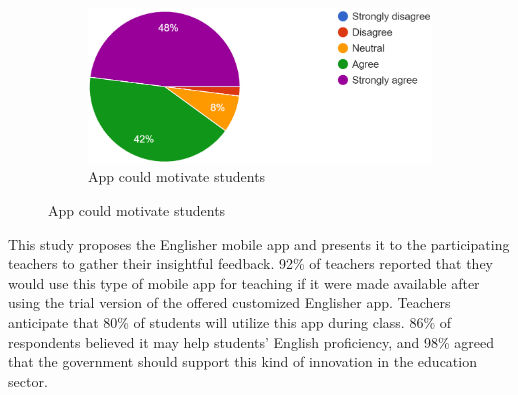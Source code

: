\documentclass[sn-mathphys,Numbered]{sn-jnl}%
\theoremstyle{thmstyleone}%
\theoremstyle{thmstyletwo}%
\theoremstyle{thmstylethree}%
\begin{document}
\begin{figure}[h!]
\begin{subfigure}{0.44\textwidth}
    \label{cv}
\end{subfigure}
\hfill
\begin{subfigure}{0.47\textwidth}
    \includegraphics[width=\textwidth]{app_motivates.png}
    \caption{App could motivate students}
    \label{umass}
\end{subfigure}        
\label{cv_umass}
\end{figure}

This study proposes the Englisher mobile app and presents it to the participating teachers to gather their insightful feedback. 92\% of teachers reported that they would use this type of mobile app for teaching if it were made available after using the trial version of the offered customized Englisher app. Teachers anticipate that 80\% of students will utilize this app during class. 86\% of respondents believed it may help students' English proficiency, and 98\% agreed that the government should support this kind of innovation in the education sector.\\
\end{document}
